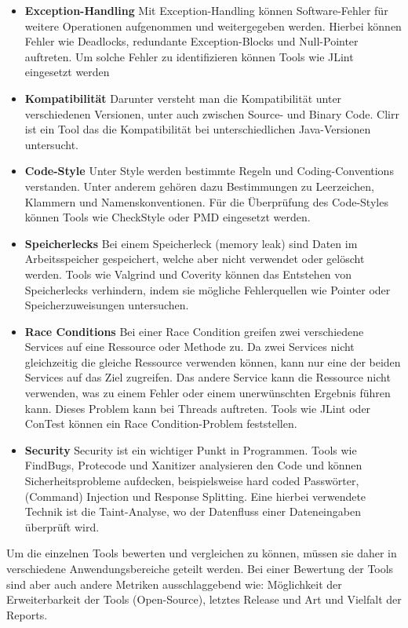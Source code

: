 \begin{itemize}
\item \textbf{Exception-Handling} Mit Exception-Handling können Software-Fehler für weitere Operationen aufgenommen und weitergegeben werden. Hierbei können Fehler wie Deadlocks, redundante Exception-Blocks und Null-Pointer auftreten. Um solche Fehler zu identifizieren können Tools wie JLint eingesetzt werden
\item \textbf{Kompatibilität} Darunter versteht man die Kompatibilität unter verschiedenen Versionen, unter auch zwischen Source- und Binary Code.  Clirr ist ein Tool das die Kompatibilität bei unterschiedlichen Java-Versionen untersucht. 
\item \textbf{Code-Style} Unter Style werden bestimmte Regeln und Coding-Conventions verstanden. Unter anderem gehören dazu Bestimmungen zu Leerzeichen, Klammern und Namenskonventionen. Für die Überprüfung des Code-Styles können Tools wie CheckStyle oder PMD eingesetzt werden.
\item \textbf{Speicherlecks}
Bei einem Speicherleck (memory leak) sind Daten im Arbeitsspeicher gespeichert,  welche aber nicht verwendet oder gelöscht werden. Tools wie Valgrind und Coverity können das Entstehen von Speicherlecks verhindern, indem sie mögliche Fehlerquellen wie Pointer oder Speicherzuweisungen untersuchen.
\item \textbf{Race Conditions}
Bei einer Race Condition greifen zwei verschiedene Services auf eine Ressource oder Methode zu. Da zwei Services nicht gleichzeitig die  gleiche Ressource verwenden können, kann nur eine der beiden Services auf das Ziel zugreifen. Das andere Service kann die Ressource nicht verwenden, was zu einem Fehler oder einem unerwünschten Ergebnis führen kann. Dieses Problem kann bei Threads auftreten. Tools wie JLint oder ConTest können ein Race Condition-Problem feststellen.
\item \textbf{Security}
Security ist ein wichtiger Punkt in Programmen. Tools wie FindBugs, Protecode und Xanitizer analysieren den Code und können Sicherheitsprobleme aufdecken, beispielsweise hard coded Passwörter, (Command) Injection und Response Splitting. \cite{goseva2015capability} Eine hierbei verwendete Technik ist die Taint-Analyse, wo der Datenfluss einer Dateneingaben überprüft wird. \cite{jung2014sensitive}
\end{itemize}

Um die einzelnen Tools bewerten und vergleichen zu können, müssen sie daher in verschiedene Anwendungsbereiche geteilt werden. Bei einer Bewertung der Tools sind aber auch andere Metriken ausschlaggebend wie: Möglichkeit der Erweiterbarkeit der Tools (Open-Source), letztes Release und Art und Vielfalt der Reports. ~\parencite{comparativeAnalysisTools}

